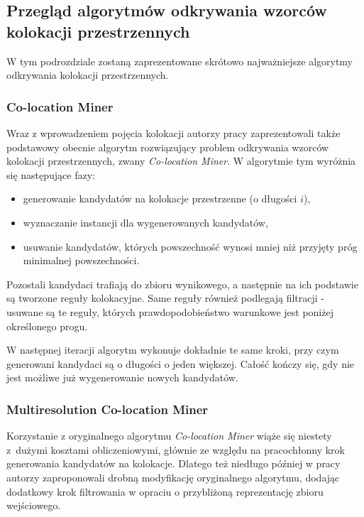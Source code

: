 \documentclass[12pt]{article}
\begin{document}
\subsection{Przegląd algorytmów odkrywania wzorców kolokacji przestrzennych}

W tym podrozdziale zostaną zaprezentowane skrótowo najważniejsze algorytmy odkrywania kolokacji przestrzennych. 

\subsubsection{Co-location Miner}
\label{subsec:clm}

Wraz z wprowadzeniem pojęcia kolokacji autorzy pracy \cite{huang} zaprezentowali także podstawowy obecnie algorytm rozwiązujący problem odkrywania wzorców kolokacji przestrzennych, zwany \textit{Co-location Miner}. W algorytmie tym wyróżnia się następujące fazy:

\begin{itemize}
\item generowanie kandydatów na kolokacje przestrzenne (o długości $i$),
\item wyznaczanie instancji dla wygenerowanych kandydatów,
\item usuwanie kandydatów, których powszechność wynosi mniej niż przyjęty próg minimalnej powszechności.
\end{itemize}

Pozostali kandydaci trafiają do zbioru wynikowego, a następnie na ich podstawie są tworzone reguły kolokacyjne. Same reguły również podlegają filtracji - usuwane są te reguły, których prawdopodobieństwo warunkowe jest poniżej określonego progu. 

W następnej iteracji algorytm wykonuje dokładnie te same kroki, przy czym generowani kandydaci są o długości o jeden większej. Całość kończy się, gdy nie jest możliwe już wygenerowanie nowych kandydatów.

\subsubsection{Multiresolution Co-location Miner}

Korzystanie z oryginalnego algorytmu \textit{Co-location Miner} wiąże się niestety z~dużymi kosztami obliczeniowymi, głównie ze względu na pracochłonny krok generowania kandydatów na kolokacje. Dlatego też niedługo później w pracy \cite{multihuang} autorzy zaproponowali drobną modyfikację oryginalnego algorytmu, dodając dodatkowy krok filtrowania w opraciu o przybliżoną reprezentację zbioru wejściowego.
\end{document}
